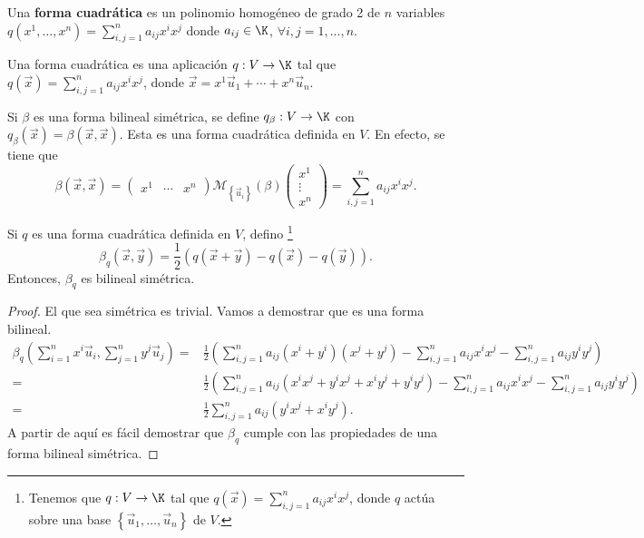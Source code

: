 \begin{fdefinition}
\normalfont Una \textbf{forma cuadrática} es un polinomio homogéneo de grado 2 de $\displaystyle n $ variables $\displaystyle q\left(x^{1}, \ldots, x^{n}\right) = \sum^{n}_{i,j = 1}a_{ij}x^{i}x^{j} $ donde $\displaystyle a_{ij } \in \K $, $\displaystyle \forall i,j = 1, \ldots, n $.
\end{fdefinition}
\begin{observation}
\normalfont Una forma cuadrática es una aplicación $\displaystyle q : V \to \K $ tal que $\displaystyle q\left(\vec{x}\right) = \sum^{n}_{i,j=1}a_{ij}x^{i}x^{j} $, donde $\displaystyle \vec{x} = x^{1}\vec{u}_{1} + \cdots + x^{n}\vec{u}_{n} $.
\end{observation}
Si $\displaystyle \beta  $ es una forma bilineal simétrica, se define $\displaystyle q_{\beta }: V \to \K $ con $\displaystyle q_{\beta }\left(\vec{x}\right) = \beta\left(\vec{x}, \vec{x}\right) $. Esta es una forma cuadrática definida en $\displaystyle V $. En efecto, se tiene que
\[\beta\left(\vec{x}, \vec{x}\right) = \begin{pmatrix} x^{1} & \cdots & x^{n} \end{pmatrix} \mathcal{M}_{ \left\{ \vec{u}_{i}\right\} }\left(\beta \right)\begin{pmatrix} x^{1} \\ \vdots \\ x^{n} \end{pmatrix} = \sum^{n}_{ i,j = 1}a_{ij}x^{i}x^{j} .\]
\begin{fprop}[]
	\normalfont Si $\displaystyle q  $ es una forma cuadrática definida en $\displaystyle V $, defino \footnote{Tenemos que $\displaystyle q : V \to \K $ tal que $\displaystyle q\left(\vec{x}\right) = \sum^{n}_{i,j=1}a_{ij}x^{i}x^{j} $, donde $\displaystyle q $ actúa sobre una base $\displaystyle \left\{ \vec{u}_{1}, \ldots,\vec{u}_{n}\right\}  $ de $\displaystyle V $.} 
\[ \beta_{q} \left(\vec{x}, \vec{y}\right) = \frac{1}{2}\left(q\left(\vec{x} + \vec{y}\right) - q\left(\vec{x}\right)-q\left(\vec{y}\right)\right).\]
Entonces, $\displaystyle \beta_{q} $ es bilineal simétrica.
\end{fprop}
\begin{proof}
El que sea simétrica es trivial. Vamos a demostrar que es una forma bilineal.
\[
\begin{split}
	\beta_{q}\left(\sum^{n}_{ i= 1}x^{i}\vec{u}_{i}, \sum^{n}_{j=1}y^{j}\vec{u}_{j}\right) = & \frac{1}{2}\left(\sum^{n}_{i,j=1}a_{ij}\left(x^{i}+y^{i}\right)\left(x^{j}+y^{j}\right) - \sum^{n}_{i,j=1}a_{ij}x^{i}x^{j}-\sum^{n}_{i,j=1}a_{ij}y^{i}y^{j}\right) \\
	= & \frac{1}{2}\left(\sum^{n}_{i,j=1}a_{ij}\left(x^{i}x^{j} + y^{i}x^{j} + x^{i}y^{j} + y^{i}y^{j}\right)-\sum^{n}_{i,j=1}a_{ij}x^{i}x^{j}-\sum^{n}_{i,j=1}a_{ij}y^{i}y^{j}\right) \\
	= & \frac{1}{2}\sum^{n}_{i,j=1}a_{ij}\left(y^{i}x^{j}+x^{i}y^{j}\right).
\end{split}
\]
A partir de aquí es fácil demostrar que $\displaystyle \beta_{q} $ cumple con las propiedades de una forma bilineal simétrica.
\end{proof}
